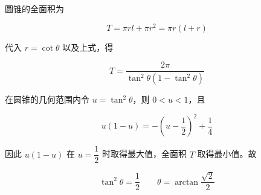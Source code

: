 \begin{answer}

圆锥的全面积为

\nopagebreak[4]
\[
T=\pi rl+\pi r^2=\pi r(l+r)
\]

代入 $r=\cot\theta$ 以及上式，得

\nopagebreak[4]
\[
T=\frac{2\pi}{\tan^2\theta\left(1-\tan^2\theta\right)}
\]


在圆锥的几何范围内令 $u=\tan^2\theta$，则 $0<u<1$，且

\nopagebreak[4]
\[
u(1-u)=-\left(u-\frac12\right)^2+\frac14
\]

因此 $u(1-u)$ 在 $u=\dfrac12$ 时取得最大值，全面积 $T$ 取得最小值。故

\nopagebreak[4]
\[
\tan^2\theta=\frac12
\qquad \theta=\arctan\frac{\sqrt2}{2}
\]




\end{answer}